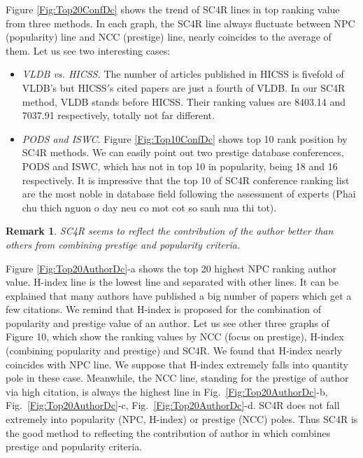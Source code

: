 \documentclass[10pt,leqno,twoside]{article}
\newtheorem{remark}{\indent Remark}[section]
\begin{document}
Figure \ref{Fig:Top20ConfDc} shows the trend of SC4R lines in top ranking value from three methods. In each graph, the SC4R line always fluctuate between NPC (popularity) line and NCC (prestige) line, nearly coincides to the average of them. 
Let us see two interesting cases:
\begin{itemize} 
\item \textit{VLDB vs. HICSS.} The number of articles published in HICSS is fivefold of VLDB's but HICSS$'$s cited papers are just a fourth of VLDB. In our SC4R method, VLDB stands before HICSS. Their ranking values are 8403.14 and 7037.91 respectively, totally not far different.

\item \textit{PODS and ISWC}. Figure \ref{Fig:Top10ConfDc} shows top 10 rank position by SC4R methods. We can easily point out two prestige database conferences, PODS and ISWC, which has not in top 10 in popularity, being 18 and 16 respectively.
It is impressive that the top 10 of SC4R conference ranking list are the most noble in database field following the assessment of experts (Phai chu thich nguon o day neu co mot cot so sanh nua thi tot).
\end{itemize}
%


\begin{remark}
SC4R seems to reflect the contribution of the author better than others from combining prestige and popularity criteria. 
\end{remark}
Figure \ref{Fig:Top20AuthorDc}-a shows the top 20 highest NPC ranking author value.  H-index line is the lowest line and separated with other lines. It can be explained that  many authors have published a big number of papers which get a few citations. We remind that H-index is proposed for the combination of popularity and prestige value of an author. Let us see other three graphs of Figure 10, which show the ranking values by NCC (focus on prestige), H-index (combining popularity and prestige) and SC4R. We found that H-index nearly coincides with NPC line. We suppose that H-index extremely falls into quantity pole in these case. Meanwhile, the NCC line, standing for the prestige of author via high citation, is always the highest line in Fig.~\ref{Fig:Top20AuthorDc}-b, Fig.~\ref{Fig:Top20AuthorDc}-c, Fig.~\ref{Fig:Top20AuthorDc}-d. SC4R does not fall extremely into popularity (NPC, H-index) or prestige (NCC) poles. Thus SC4R is the good method to reflecting the contribution of author in which combines prestige and popularity criteria. 
\end{document}
